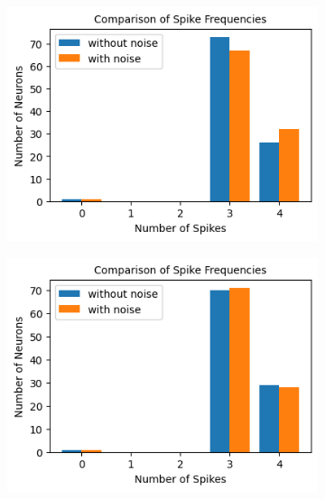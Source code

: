 \documentclass[12pt]{article}
\begin{document}
\begin{figure}[H]
  \begin{subfigure}[b]{0.3\textwidth}
    \includegraphics[width=\textwidth]{Figs/full.png}
    \caption{}
  \end{subfigure}
  \hfill
  \begin{subfigure}[b]{0.3\textwidth}
    \includegraphics[width=\textwidth]{Figs/fixed_prob.png}
    \caption{}
  \end{subfigure}
  \hfill
  \begin{subfigure}[b]{0.3\textwidth}

\end{subfigure}
\end{figure}
\end{document}
